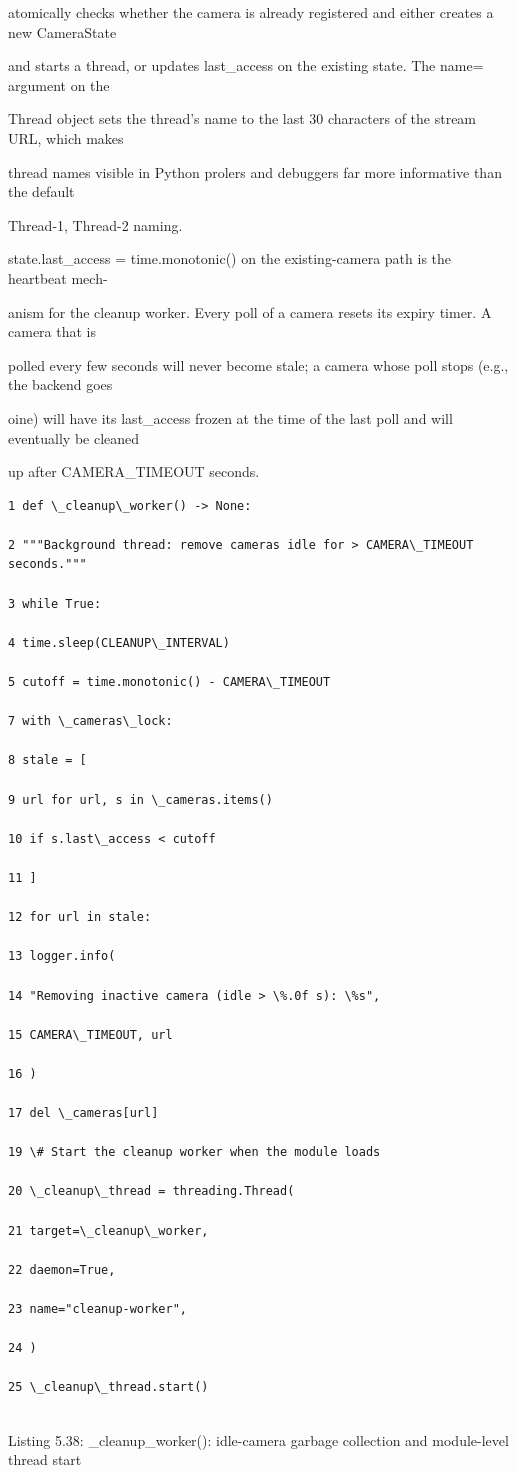 atomically checks whether the camera is already registered and either creates a new CameraState

and starts a thread, or updates last\_access on the existing state. The name= argument on the

Thread object sets the thread's name to the last 30 characters of the stream URL, which makes

thread names visible in Python prolers and debuggers  far more informative than the default

Thread-1, Thread-2 naming.

state.last\_access = time.monotonic() on the existing-camera path is the heartbeat mech-

anism for the cleanup worker. Every poll of a camera resets its expiry timer. A camera that is

polled every few seconds will never become stale; a camera whose poll stops (e.g., the backend goes

oine) will have its last\_access frozen at the time of the last poll and will eventually be cleaned

up after CAMERA\_TIMEOUT seconds.

\begin{listingbox}
	\begin{verbatim}
1 def \_cleanup\_worker() -> None:

2 """Background thread: remove cameras idle for > CAMERA\_TIMEOUT seconds."""

3 while True:

4 time.sleep(CLEANUP\_INTERVAL)

5 cutoff = time.monotonic() - CAMERA\_TIMEOUT

7 with \_cameras\_lock:

8 stale = [

9 url for url, s in \_cameras.items()

10 if s.last\_access < cutoff

11 ]

12 for url in stale:

13 logger.info(

14 "Removing inactive camera (idle > \%.0f s): \%s",

15 CAMERA\_TIMEOUT, url

16 )

17 del \_cameras[url]

19 \# Start the cleanup worker when the module loads

20 \_cleanup\_thread = threading.Thread(

21 target=\_cleanup\_worker,

22 daemon=True,

23 name="cleanup-worker",

24 )

25 \_cleanup\_thread.start()


\end{verbatim}
\end{listingbox}
Listing 5.38: \_cleanup\_worker(): idle-camera garbage collection and module-level thread start

